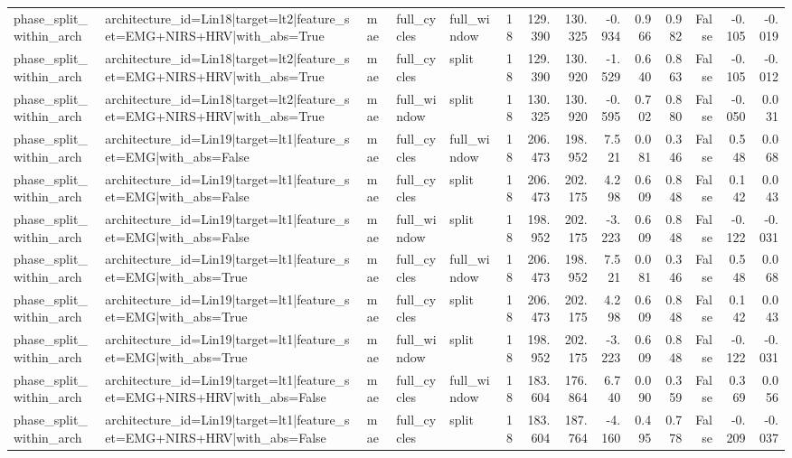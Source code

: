 \begin{table}
\begin{tabular}{lllllrrrrrrrrr}
phase_split_within_arch & architecture_id=Lin18|target=lt2|feature_set=EMG+NIRS+HRV|with_abs=True & mae & full_cycles & full_window & 18 & 129.390 & 130.325 & -0.934 & 0.966 & 0.982 & False & -0.105 & -0.019 \\
phase_split_within_arch & architecture_id=Lin18|target=lt2|feature_set=EMG+NIRS+HRV|with_abs=True & mae & full_cycles & split & 18 & 129.390 & 130.920 & -1.529 & 0.640 & 0.863 & False & -0.105 & -0.012 \\
phase_split_within_arch & architecture_id=Lin18|target=lt2|feature_set=EMG+NIRS+HRV|with_abs=True & mae & full_window & split & 18 & 130.325 & 130.920 & -0.595 & 0.702 & 0.880 & False & -0.050 & 0.031 \\
phase_split_within_arch & architecture_id=Lin19|target=lt1|feature_set=EMG|with_abs=False & mae & full_cycles & full_window & 18 & 206.473 & 198.952 & 7.521 & 0.081 & 0.346 & False & 0.548 & 0.068 \\
phase_split_within_arch & architecture_id=Lin19|target=lt1|feature_set=EMG|with_abs=False & mae & full_cycles & split & 18 & 206.473 & 202.175 & 4.298 & 0.609 & 0.848 & False & 0.142 & 0.043 \\
phase_split_within_arch & architecture_id=Lin19|target=lt1|feature_set=EMG|with_abs=False & mae & full_window & split & 18 & 198.952 & 202.175 & -3.223 & 0.609 & 0.848 & False & -0.122 & -0.031 \\
phase_split_within_arch & architecture_id=Lin19|target=lt1|feature_set=EMG|with_abs=True & mae & full_cycles & full_window & 18 & 206.473 & 198.952 & 7.521 & 0.081 & 0.346 & False & 0.548 & 0.068 \\
phase_split_within_arch & architecture_id=Lin19|target=lt1|feature_set=EMG|with_abs=True & mae & full_cycles & split & 18 & 206.473 & 202.175 & 4.298 & 0.609 & 0.848 & False & 0.142 & 0.043 \\
phase_split_within_arch & architecture_id=Lin19|target=lt1|feature_set=EMG|with_abs=True & mae & full_window & split & 18 & 198.952 & 202.175 & -3.223 & 0.609 & 0.848 & False & -0.122 & -0.031 \\
phase_split_within_arch & architecture_id=Lin19|target=lt1|feature_set=EMG+NIRS+HRV|with_abs=False & mae & full_cycles & full_window & 18 & 183.604 & 176.864 & 6.740 & 0.090 & 0.359 & False & 0.369 & 0.056 \\
phase_split_within_arch & architecture_id=Lin19|target=lt1|feature_set=EMG+NIRS+HRV|with_abs=False & mae & full_cycles & split & 18 & 183.604 & 187.764 & -4.160 & 0.495 & 0.778 & False & -0.209 & -0.037 \\

\end{tabular}
\end{table}
